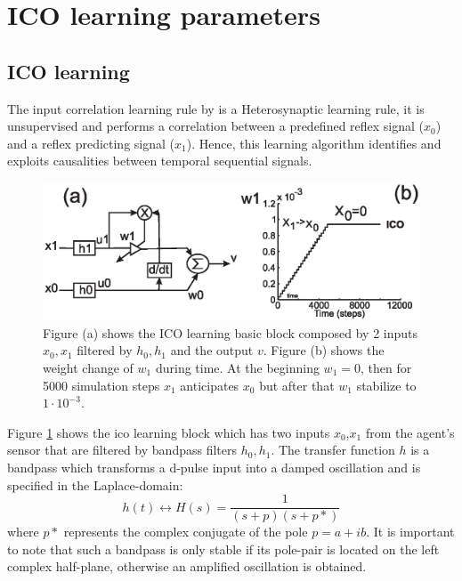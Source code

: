 
\section{ICO learning parameters \label{app:appendixICO}}

\subsection{ICO learning}
The input correlation learning rule by \citet{Porr2006ICO} is a Heterosynaptic
learning rule, it is unsupervised and performs a correlation between a predefined reflex signal
($x_{0}$) and a reflex predicting signal ($x_{1}$).
Hence, this learning
algorithm identifies and exploits causalities between temporal
sequential signals.

\begin{figure}[htbp]
\begin{center}
\includegraphics[scale=0.5]{figures/socialadapt/ico.eps}
\caption[Agent learns with the ICO learning]{Figure (a) shows the ICO learning basic
block composed by 2 inputs $x_{0},x_{1}$ filtered by $h_{0},h_{1}$ and the output $v$.
Figure (b) shows the weight change of $w_{1}$ during time. At the beginning $w_{1}=0$,
then for 5000 simulation steps $x_{1}$ anticipates $x_{0}$ but after that $w_{1}$ stabilize to $1 \cdot 10^{-3}$.
\label{fig:appendix.ICO}}
\end{center}
\end{figure}

Figure \ref{fig:appendix.ICO} shows the ico learning block which has two inputs $x_{0}$,$x_{1}$
from the agent's sensor that are filtered by bandpass filters $h_{0},h_{1}$.
The transfer function $h$ is a bandpass which transforms
a d-pulse input into a damped oscillation and is specified in the
Laplace-domain:
\begin{equation}
h(t) \leftrightarrow H(s) =\frac{1}{(s+p)(s+p*)}
\end{equation}
where $p*$ represents the complex conjugate of the pole $p = a + ib$. It is
important to note that such a bandpass is only stable if its pole-pair is
located on the left complex half-plane, otherwise an amplified oscillation is
obtained.

